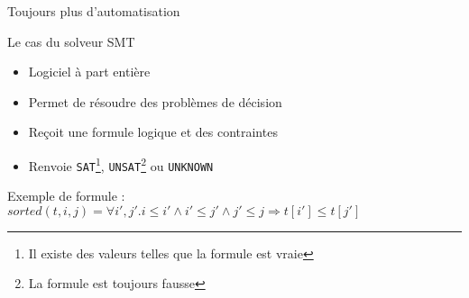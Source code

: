 \documentclass[french,usepdftitle=false,compress]{beamer}
\begin{document}
\begin{frame}{Toujours plus d'automatisation}
  \begin{block}{Le cas du solveur SMT}
    \begin{itemize}
      \item Logiciel à part entière
      \item Permet de résoudre des problèmes de décision
      \item Reçoit une formule logique et des contraintes
      \item Renvoie \texttt{SAT}\footnote{Il existe des valeurs telles que la formule est vraie}, \texttt{UNSAT}\footnote{La formule est toujours fausse} ou \texttt{UNKNOWN}
    \end{itemize}
  \end{block}

  \begin{block}{Exemple de formule :}
    \begin{math}
      sorted(t,i,j) = \forall i',j'. i \leq i' \land i' \leq j' \land j' \leq j \Rightarrow t[i'] \leq t[j']
    \end{math}
  \end{block}
\end{frame}
\end{document}
